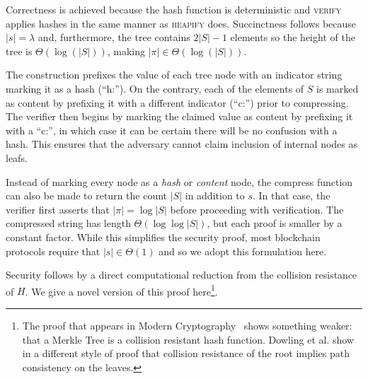 Correctness is achieved because the hash function is deterministic and
\textsc{verify} applies hashes in the same manner as \textsc{heapify} does.
Succinctness follows because $|s| = \lambda$ and, furthermore, the tree contains
$2|S| - 1$ elements so the height of the tree is $\Theta(\log(|S|))$, making
$|\pi| \in \Theta(\log(|S|))$.

The construction prefixes the value of each tree node with an indicator string
marking it as a hash (``h:''). On the contrary, each of the elements of $S$ is
marked as content by prefixing it with a different indicator (``c:'') prior to
compressing. The verifier then begins by marking the claimed value as content by
prefixing it with a ``c:'', in which case it can be certain there will be no
confusion with a hash. This ensures that the adversary cannot claim inclusion of
internal nodes as leafs.

\begin{remark}
  Instead of marking every node as a \emph{hash} or \emph{content} node, the
  \textsf{compress} function can also be made to return the count $|S|$ in
  addition to $s$. In that case, the verifier first asserts that
  $|\pi| = \log|S|$ before proceeding with verification. The compressed string
  has length $\Theta(\log\log|S|)$, but each proof is smaller by a constant
  factor. While this simplifies the security proof, most blockchain protocols
  require that $|s| \in \Theta(1)$ and so we adopt this formulation here.
\end{remark}

Security follows by a direct computational reduction from the collision
resistance of $H$. We give a novel version of this proof here\footnote{The proof
that appears in Modern Cryptography~\cite{katz} shows something weaker: that a
Merkle Tree is a collision resistant hash function. Dowling et
al.\cite{dowling2016secure} show in a different style of proof that collision
resistance of the root implies path consistency on the leaves.}.



